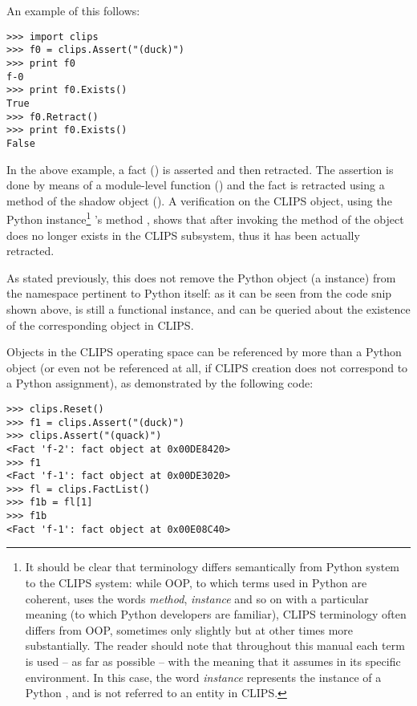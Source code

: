 An example of this follows:

\begin{verbatim}
>>> import clips
>>> f0 = clips.Assert("(duck)")
>>> print f0
f-0
>>> print f0.Exists()
True
>>> f0.Retract()
>>> print f0.Exists()
False
\end{verbatim}

In the above example, a fact () is asserted and then
retracted. The assertion is done by means of a module-level function
() and the fact is retracted using a method of the
shadow object (). A verification on the CLIPS  object,
using the Python  instance\footnote{It should be clear
that terminology differs semantically from Python system to the CLIPS
system: while OOP, to which terms used in Python are coherent, uses
the words \emph{method}, \emph{instance} and so on with a particular
meaning (to which Python developers are familiar), CLIPS terminology
often differs from OOP, sometimes only slightly but at other times more
substantially. The reader should note that throughout this manual
each term is used -- as far as possible -- with the meaning that it
assumes in its specific environment. In this case, the word
\emph{instance} represents the instance of a Python ,
and is not referred to an entity in CLIPS.} 's method
, shows that after invoking the 
method of  the  object does no longer exists in the
CLIPS subsystem, thus it has been actually retracted.

As stated previously, this does not remove the Python object
(a  instance) from the namespace pertinent to Python itself:
as it can be seen from the code snip shown above,  is still a
functional instance, and can be queried about the existence of the
corresponding object in CLIPS.

Objects in the CLIPS operating space can be referenced by more than a
Python object (or even not be referenced at all, if CLIPS creation does
not correspond to a Python assignment), as demonstrated by the following
code:

\begin{verbatim}
>>> clips.Reset()
>>> f1 = clips.Assert("(duck)")
>>> clips.Assert("(quack)")
<Fact 'f-2': fact object at 0x00DE8420>
>>> f1
<Fact 'f-1': fact object at 0x00DE3020>
>>> fl = clips.FactList()
>>> f1b = fl[1]
>>> f1b
<Fact 'f-1': fact object at 0x00E08C40>
\end{verbatim}


